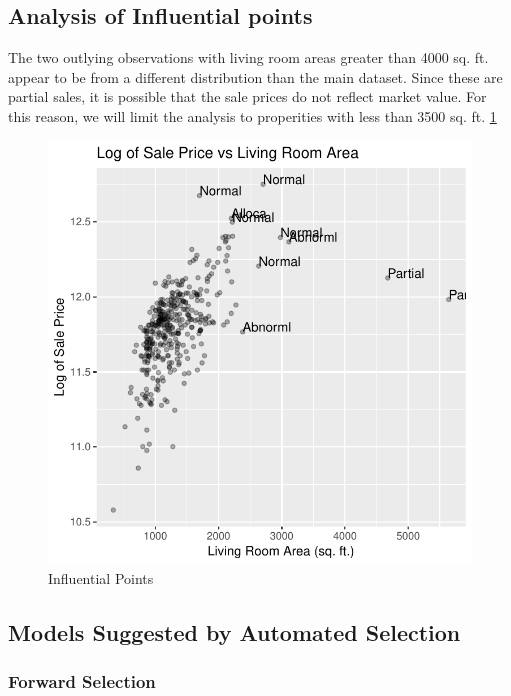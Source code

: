 \documentclass[american,]{article}
\begin{document}
\hypertarget{analysis-of-influential-points}{%
\subsection{Analysis of Influential
points}\label{analysis-of-influential-points}}

\label{appendix:infleu-points}

The two outlying observations with living room areas greater than 4000
sq. ft. appear to be from a different distribution than the main
dataset. Since these are partial sales, it is possible that the sale
prices do not reflect market value. For this reason, we will limit the
analysis to properities with less than 3500 sq. ft.
\ref{fig:infleu-points}

\begin{figure}[htbp]

{\centering \includegraphics[width=0.5\linewidth]{HousePriceRegressionAnalysis_files/figure-latex/infleu-points-1} 

}

\caption{Influential Points}\label{fig:infleu-points}
\end{figure}

\newpage

\hypertarget{models-suggested-by-automated-selection}{%
\subsection{Models Suggested by Automated
Selection}\label{models-suggested-by-automated-selection}}

\hypertarget{forward-selection}{%
\subsubsection{Forward Selection}\label{forward-selection}}

\label{appendix:forSelection}
\end{document}
